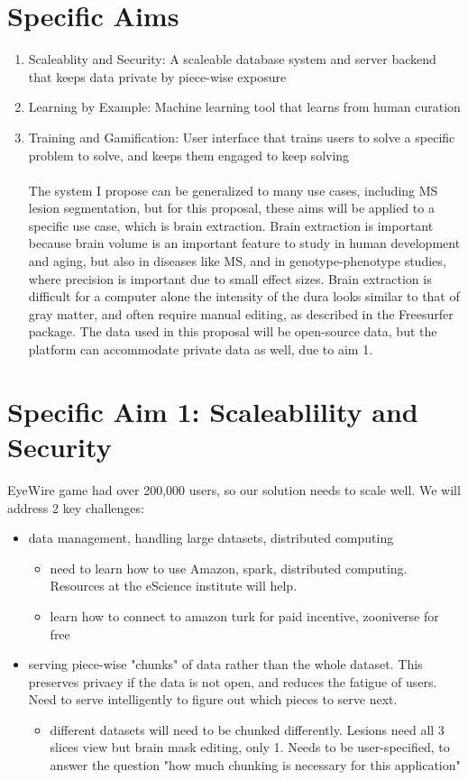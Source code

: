 \section{Specific Aims}
\begin{enumerate}
\item Scaleablity and Security: A scaleable database system and server backend that keeps data private by piece-wise exposure
\item Learning by Example: Machine learning tool that learns from human curation
\item Training and Gamification: User interface that trains users to solve a specific problem to solve, and keeps them engaged to keep solving
\\
\\
The system I propose can be generalized to many use cases, including MS lesion segmentation, but for this proposal, these aims will be applied to a specific use case, which is brain extraction. Brain extraction is important because brain volume is an important feature to study in human development and aging, but also in diseases like MS, and in genotype-phenotype studies, where precision is important due to small effect sizes. Brain extraction is difficult for a computer alone the intensity of the dura looks similar to that of gray matter, and often require manual editing, as described in the Freesurfer package. The data used in this proposal will be open-source data, but the platform can accommodate private data as well, due to aim 1. 

\end{enumerate}

\section{Specific Aim 1: Scaleablility and Security}
EyeWire game had over 200,000 users, so our solution needs to scale well. 
We will address 2 key challenges:
\begin{itemize}
\item data management, handling large datasets, distributed computing 
\begin{itemize}
\item need to learn how to use Amazon, spark, distributed computing. Resources at the eScience institute will help. 
\item learn how to connect to amazon turk for paid incentive, zooniverse for free
\end{itemize}
\item serving piece-wise "chunks" of data rather than the whole dataset. This preserves privacy if the data is not open, and reduces the fatigue of users. Need to serve intelligently to figure out which pieces to serve next.
\begin{itemize}
\item different datasets will need to be chunked differently. Lesions need all 3 slices view but brain mask editing, only 1. Needs to be user-specified, to answer the question "how much chunking is necessary for this application"
\end{itemize}
\end{itemize}

